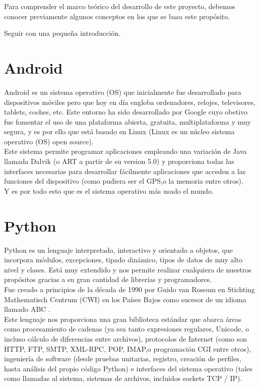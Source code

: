 
Para comprender el marco teórico del desarrollo de este proyecto, debemos conocer previamente algunos conceptos en los que se basa este propósito.

Seguir con una pequeña introducción.


\section{Android}

Android \cite{book:android} es un sistema operativo (OS) que inicialmente fue desarrollado para dispositivos móviles pero que hoy en día engloba ordenadores, relojes, televisores, tablets, coches, etc. Este entorno ha sido desarrollado por Google cuyo obetivo fue fomentar el uso de una plataforma abierta, gratuita, multiplataforma y muy segura, y es por ello que está basado en Linux (Linux es un núcleo sistema operativo (OS) open source).\\
Este sistema permite programar aplicaciones empleando una variación de Java llamada Dalvik (o ART a partir de su version 5.0) y proporciona todas las interfaces necesarias para desarrollar fácilmente aplicaciones que acceden a las funciones del dispositivo (como pudiera ser el GPS,o la memoria entre otros).\\
Y es por todo esto que es el sistema operativo más usado el mundo.


\section{Python}

Python \cite{python} es un lenguaje interpretado, interactivo y orientado a objetos, que incorpora módulos, excepciones, tipado dinámico, tipos de datos de muy alto nivel y clases. Está muy extendido y nos permite realizar cualquiera de nuestros propósitos gracias a su gran cantidad de librerías y programadores. \\
Fue creado a principios de la década de 1990 por Guido van Rossum en Stichting Mathematisch Centrum (CWI) en los Países Bajos como sucesor de un idioma llamado ABC \cite{pythonhistory}. \\
Este lenguaje \cite{python} nos proporciona una gran biblioteca estándar que abarca áreas como procesamiento de cadenas (ya sea tanto expresiones regulares, Unicode, o incluso cálculo de diferencias entre archivos), protocolos de Internet (como son HTTP, FTP, SMTP, XML-RPC, POP, IMAP,o programación CGI entre otros), ingeniería de software (desde pruebas unitarias, registro, creación de perfiles, hasta análisis del propio código Python) e interfaces del sistema operativo (tales como llamadas al sistema, sistemas de archivos, incluidos sockets TCP / IP).

